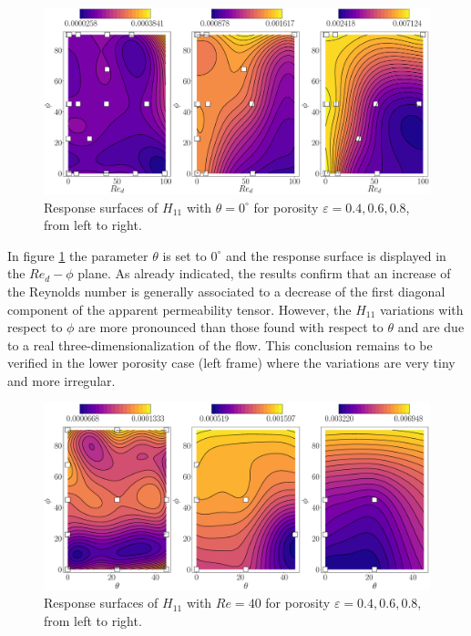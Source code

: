 \begin{figure}[t]
	\centering
	\includegraphics[width=1\linewidth]{chapter_4/figure/krig_mater_ph_re}
	\caption{Response surfaces of $H_{11}$ with $\theta=0^{\circ}$ for porosity $\varepsilon=0.4, 0.6, 0.8$, from left to right.}
	\label{fig:ph_re}
\end{figure}


In  figure \ref{fig:ph_re} the parameter  $\theta$ is set to  $0^{\circ}$ and  the response surface is displayed in the $Re_d - \phi$ plane.
As already indicated, the results confirm that an  increase of  the Reynolds number is generally associated to  a decrease of  the first diagonal component  of the apparent permeability tensor. However, the $H_{11}$ variations with respect to $\phi$ are more pronounced than those found with respect to $\theta$ and are due to a real three-dimensionalization of the flow.
This conclusion remains to be verified in the lower porosity case (left frame) where the variations are very tiny and more irregular.





\begin{figure}[t]
	\centering
	\includegraphics[width=1\linewidth]{chapter_4/figure/krig_mater_th_phi_re40}
	\caption{Response surfaces of $H_{11}$ with $Re=40$ for porosity $\varepsilon=0.4, 0.6, 0.8$, from left to right.}
	\label{fig:th_ph}
\end{figure}


